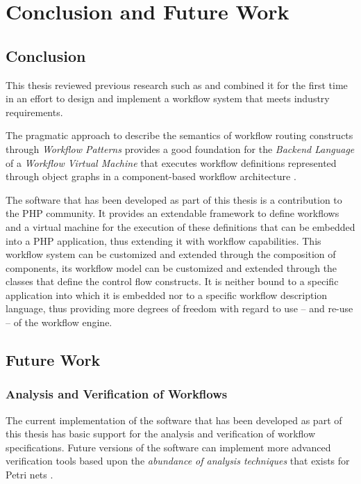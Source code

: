 \chapter{Conclusion and Future Work}
\label{chapter-Conclusion}

\section{Conclusion}

This thesis reviewed previous research such as \cite{BK03,DAM01,PM99,SF04}
and combined it for the first time in an effort to design and implement a
workflow system that meets industry requirements.

The pragmatic approach to describe the semantics of workflow routing constructs
through \emph{Workflow Patterns} \cite{BK03} provides a good foundation for the
\emph{Backend Language} of a \emph{Workflow Virtual Machine} \cite{SF04} that
executes workflow definitions represented through object graphs in a
component-based workflow architecture \cite{DAM01}.

The software that has been developed as part of this thesis is a contribution
to the PHP community. It provides an extendable framework to define workflows
and a virtual machine for the execution of these definitions that can be
embedded into a PHP application, thus extending it with workflow capabilities.
This workflow system can be customized and extended through the composition of
components, its workflow model can be customized and extended through the
classes that define the control flow constructs. It is neither bound to a
specific application into which it is embedded nor to a specific workflow
description language, thus providing more degrees of freedom with regard to
use -- and re-use -- of the workflow engine.

\section{Future Work}

\subsection{Analysis and Verification of Workflows}

The current implementation of the software that has been developed as part of
this thesis has basic support for the analysis and verification of workflow
specifications. Future versions of the software can implement more advanced
verification tools based upon the \emph{abundance of analysis techniques} that
exists for Petri nets \cite{WA96}.

